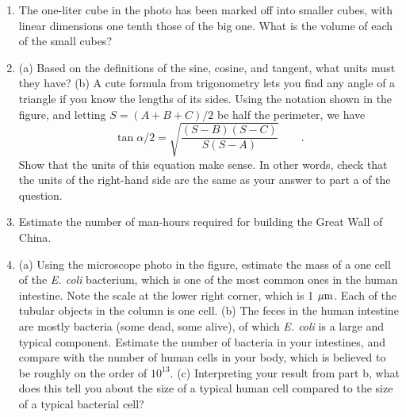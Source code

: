 \begin{enumerate}
\label{triangle-formula}

\item
The one-liter cube in the photo has been marked off into smaller
cubes, with linear dimensions one tenth those of the big one.
What is the volume of each of the small cubes?
\label{hw:liter-cube}


\vspace{1.5mm}

\item  
(a) Based on the definitions of the sine, cosine, and tangent, what units
must they have?
(b) A cute formula from trigonometry lets you find any angle of
a triangle if you know the lengths of its sides. Using the
notation shown in the figure, and letting $S=(A+B+C)/2$ be half the
perimeter, we have 
\begin{equation*}
 \tan \alpha/2=\sqrt{\frac{(S-B)(S-C)}{S(S-A)}} \qquad .
\end{equation*}
Show that the units of this equation make sense. In other words, check that the
units of the right-hand side are the same as your answer to part a of the question.

\item
Estimate the number of man-hours required for building the Great Wall of China. 

\item 
(a) Using the microscope photo in the figure, estimate the mass of a one cell of the
\emph{E. coli} bacterium, which is one of the most common ones in the human
intestine. Note the scale at the lower right corner, which is 1 $\mu\textup{m}$. Each of
the tubular objects in the column is one cell.
(b) The feces in the human intestine are mostly bacteria (some dead, some alive),
of which \emph{E. coli} is a large and typical component. Estimate the number of bacteria
in your intestines, and compare with the number of human cells in your body, which is
believed to be roughly on the order of $10^{13}$. (c) Interpreting your result from part b,
what does this tell you about the size of a typical human cell compared to the size of
a typical bacterial cell?
\label{hw:e-coli}



\end{enumerate}
